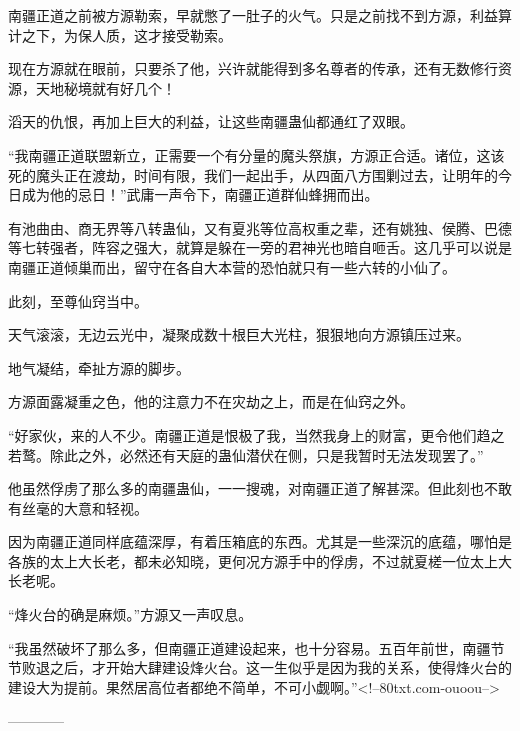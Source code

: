 \begin{this_body}
南疆正道之前被方源勒索，早就憋了一肚子的火气。只是之前找不到方源，利益算计之下，为保人质，这才接受勒索。

现在方源就在眼前，只要杀了他，兴许就能得到多名尊者的传承，还有无数修行资源，天地秘境就有好几个！

滔天的仇恨，再加上巨大的利益，让这些南疆蛊仙都通红了双眼。

“我南疆正道联盟新立，正需要一个有分量的魔头祭旗，方源正合适。诸位，这该死的魔头正在渡劫，时间有限，我们一起出手，从四面八方围剿过去，让明年的今日成为他的忌日！”武庸一声令下，南疆正道群仙蜂拥而出。

有池曲由、商无界等八转蛊仙，又有夏兆等位高权重之辈，还有姚独、侯腾、巴德等七转强者，阵容之强大，就算是躲在一旁的君神光也暗自咂舌。这几乎可以说是南疆正道倾巢而出，留守在各自大本营的恐怕就只有一些六转的小仙了。

此刻，至尊仙窍当中。

天气滚滚，无边云光中，凝聚成数十根巨大光柱，狠狠地向方源镇压过来。

地气凝结，牵扯方源的脚步。

方源面露凝重之色，他的注意力不在灾劫之上，而是在仙窍之外。

“好家伙，来的人不少。南疆正道是恨极了我，当然我身上的财富，更令他们趋之若鹜。除此之外，必然还有天庭的蛊仙潜伏在侧，只是我暂时无法发现罢了。”

他虽然俘虏了那么多的南疆蛊仙，一一搜魂，对南疆正道了解甚深。但此刻也不敢有丝毫的大意和轻视。

因为南疆正道同样底蕴深厚，有着压箱底的东西。尤其是一些深沉的底蕴，哪怕是各族的太上大长老，都未必知晓，更何况方源手中的俘虏，不过就夏槎一位太上大长老呢。

“烽火台的确是麻烦。”方源又一声叹息。

“我虽然破坏了那么多，但南疆正道建设起来，也十分容易。五百年前世，南疆节节败退之后，才开始大肆建设烽火台。这一生似乎是因为我的关系，使得烽火台的建设大为提前。果然居高位者都绝不简单，不可小觑啊。”<!--80txt.com-ouoou-->

------------

\end{this_body}

